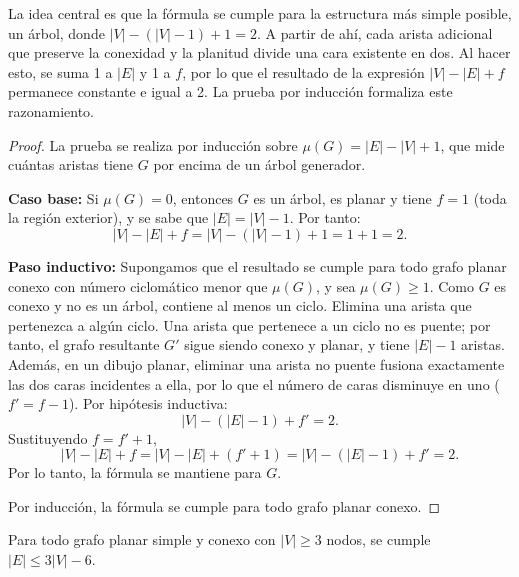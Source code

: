             La idea central es que la fórmula se cumple para la estructura más simple posible, un árbol, donde $|V| - (|V|-1) + 1 = 2$. A partir de ahí, cada arista adicional que preserve la conexidad y la planitud divide una cara existente en dos. Al hacer esto, se suma 1 a $|E|$ y 1 a $f$, por lo que el resultado de la expresión $|V| - |E| + f$ permanece constante e igual a 2. La prueba por inducción formaliza este razonamiento.

            \begin{proof}
                La prueba se realiza por inducción sobre $\mu(G)=|E|-|V|+1$, que mide cuántas aristas tiene $G$ por encima de un árbol generador.

                \textbf{Caso base:}
                Si $\mu(G)=0$, entonces $G$ es un árbol, es planar y tiene $f=1$ (toda la región exterior), y se sabe que $|E| = |V| - 1$.
                Por tanto:
                \[
                |V| - |E| + f = |V| - (|V|-1) + 1 = 1 + 1 = 2.
                \]

                \textbf{Paso inductivo:}
                Supongamos que el resultado se cumple para todo grafo planar conexo con número ciclomático menor que $\mu(G)$, y sea $\mu(G)\ge 1$.
                Como $G$ es conexo y no es un árbol, contiene al menos un ciclo.
                Elimina una arista que pertenezca a algún ciclo. Una arista que pertenece a un ciclo no es puente; por tanto, el grafo resultante $G'$ sigue siendo conexo y planar, y tiene $|E|-1$ aristas. Además, en un dibujo planar, eliminar una arista no puente fusiona exactamente las dos caras incidentes a ella, por lo que el número de caras disminuye en uno ($f'=f-1$).
                Por hipótesis inductiva:
                \[
                |V| - (|E|-1) + f' = 2.
                \]
                Sustituyendo $f = f'+1$,
                \[
                |V| - |E| + f = |V| - |E| + (f'+1)=|V|-(|E|-1)+f'=2.
                \]
                Por lo tanto, la fórmula se mantiene para $G$.

                Por inducción, la fórmula se cumple para todo grafo planar conexo.
            \end{proof}

            \begin{corolario}
                Para todo grafo planar simple y conexo con $|V| \geq 3$ nodos, se cumple $|E| \leq 3|V| - 6$.
            \end{corolario}


